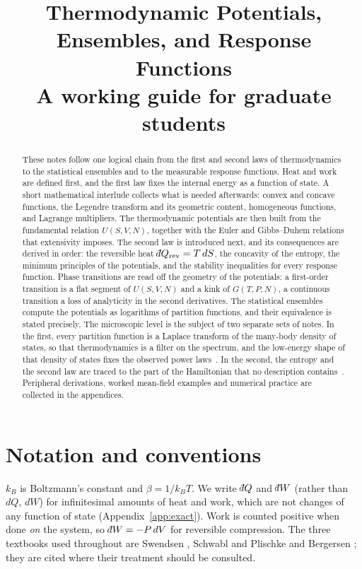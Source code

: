 \documentclass[10pt,a4paper]{article}
\title{Thermodynamic Potentials, Ensembles, and Response Functions\\
\large A working guide for graduate students}
\author{}
\date{}
\theoremstyle{remark}
\newcommand{\dbar}{\mathchar'26\mkern-11mu d}
\begin{document}
\maketitle

\begin{abstract}
These notes follow one logical chain from the first and second laws of
thermodynamics to the statistical ensembles and to the measurable response
functions. Heat and work are defined first, and the first law fixes the internal
energy as a function of state. A short mathematical interlude collects what is
needed afterwards: convex and concave functions, the Legendre transform and its
geometric content, homogeneous functions, and Lagrange multipliers. The
thermodynamic potentials are then built from the fundamental relation
$U(S,V,N)$, together with the Euler and Gibbs--Duhem relations that extensivity
imposes. The second law is introduced next, and its consequences are derived in
order: the reversible heat $\dbar Q_{\rm rev}=T\,dS$, the concavity of the
entropy, the minimum principles of the potentials, and the stability
inequalities for every response function. Phase transitions are read off the
geometry of the potentials: a first-order transition is a flat segment of
$U(S,V,N)$ and a kink of $G(T,P,N)$, a continuous transition a loss of
analyticity in the second derivatives. The statistical ensembles compute the
potentials as logarithms of partition functions, and their equivalence is
stated precisely. The microscopic level is the subject of two separate sets of
notes. In the first, every partition function is a Laplace transform of the
many-body density of states, so that thermodynamics is a filter on the spectrum,
and the low-energy shape of that density of states fixes the observed power
laws~\cite{DOSNotes}. In the second, the entropy and the second law are traced
to the part of the Hamiltonian that no description contains~\cite{ThermalNotes}. Peripheral derivations, worked mean-field examples and numerical
practice are collected in the appendices.
\end{abstract}

\tableofcontents

\section{Notation and conventions}
\label{sec:notation}

$k_B$ is Boltzmann's constant and $\beta=1/k_BT$. We write $\dbar Q$ and
$\dbar W$ (rather than $dQ$, $dW$) for infinitesimal amounts of heat and work,
which are not changes of any function of state (Appendix~\ref{app:exact}). Work
is counted positive when done \emph{on} the system, so $\dbar W=-P\,dV$ for
reversible compression. The three textbooks used throughout are Swendsen
\cite{Swendsen}, Schwabl \cite{Schwabl} and Plischke and Bergersen
\cite{Plischke}; they are cited where their treatment should be consulted.
\end{document}
